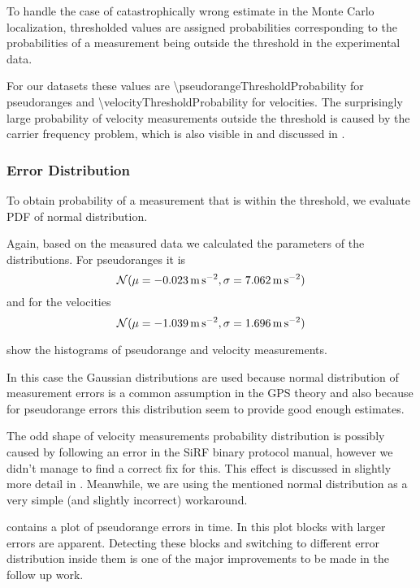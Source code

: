 To handle the case of catastrophically wrong estimate in the Monte Carlo localization,
thresholded values are assigned probabilities corresponding to the probabilities of a
measurement being outside the threshold in the experimental data.

For our datasets these values are \num{\pseudorangeThresholdProbability} for
pseudoranges and \num{\velocityThresholdProbability} for velocities.
The surprisingly large probability of velocity measurements outside the threshold
is caused by the carrier frequency problem, which is also visible in 
and discussed in .

\subsubsection{Error Distribution}
To obtain probability of a measurement that is within the threshold, we evaluate
PDF of normal distribution.

Again, based on the measured data we calculated the parameters of the distributions.
For pseudoranges it is
\begin{equation}
\operatorname{\mathcal{N}}(\mu = \SI{-0.023}{\meter\per\second\squared}, \sigma = \SI{7.062}{\meter\per\second\squared})
\end{equation}
and for the velocities
\begin{equation}
\operatorname{\mathcal{N}}(\mu = \SI{-1.039}{\meter\per\second\squared}, \sigma = \SI{1.696}{\meter\per\second\squared})
\end{equation}

 show the histograms of pseudorange
and velocity measurements.

In this case the Gaussian distributions are used because normal distribution
of measurement errors is a common assumption in the GPS theory and also because
for pseudorange errors this distribution seem to provide good enough estimates.

The odd shape of velocity measurements probability distribution is possibly
caused by following an error in the SiRF binary protocol manual,
however we didn't manage to find a correct fix for this.
This effect is discussed in slightly more detail in .
Meanwhile, we are using the mentioned normal distribution as a very simple
(and slightly incorrect) workaround.

 contains a plot of pseudorange errors in time.
In this plot blocks with larger errors are apparent.
Detecting these blocks and switching to different error distribution inside them
is one of the major improvements to be made in the follow up work.

